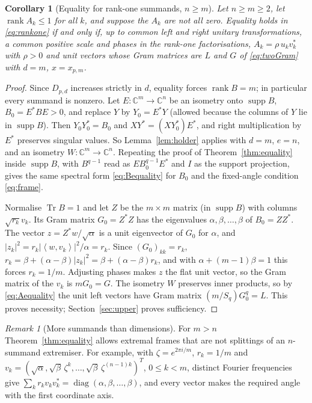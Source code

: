 \documentclass[11pt,a4paper]{article}
\numberwithin{equation}{section}
\newtheorem{corollary}[theorem]{Corollary}
\theoremstyle{definition}
\theoremstyle{remark}
\newtheorem{remark}[theorem]{Remark}
\DeclareMathOperator{\Tr}{Tr}
\DeclareMathOperator{\rank}{rank}
\DeclareMathOperator{\diag}{diag}
\DeclareMathOperator{\supp}{supp}
\newcommand{\C}{\mathbb C}
\newcommand{\abs}[1]{\left\lvert #1\right\rvert}
\newcommand{\ip}[2]{\left\langle #1,#2\right\rangle}
\begin{document}
\begin{corollary}[Equality for rank-one summands, \(n\ge m\)]
\label{cor:rankoneequality}
Let \(n\ge m\ge2\), let \(\rank A_k\le1\) for all \(k\), and suppose the
\(A_k\) are not all zero. Equality holds in \eqref{eq:rankone} if and only
if, up to common left and right unitary transformations, a common positive
scale and phases in the rank-one factorisations,
\(A_k=\rho\,u_kv_k^*\) with \(\rho>0\) and unit vectors whose Gram matrices
are \(L\) and \(G\) of \eqref{eq:twoGram} with \(d=m\), \(x=x_{p,m}\).
\end{corollary}

\begin{proof}
Since \(D_{p,d}\) increases strictly in \(d\), equality forces
\(\rank B=m\); in particular every summand is nonzero. Let
\(E:\C^m\to\C^n\) be an isometry onto \(\supp B\), \(B_0=E^*BE>0\), and
replace \(Y\) by \(Y_0=E^*Y\) (allowed because the columns of \(Y\) lie in
\(\supp B\)). Then \(Y_0Y_0^*=B_0\) and \(XY^*=(XY_0^*)E^*\), and right
multiplication by \(E^*\) preserves singular values. So
Lemma~\ref{lem:holder} applies with \(d=m\), \(e=n\), and an isometry
\(W:\C^m\to\C^n\). Repeating the proof of Theorem~\ref{thm:equality}
inside \(\supp B\), with \(B^{q-1}\) read as \(EB_0^{q-1}E^*\) and \(I\) as
the support projection, gives the same spectral form
\eqref{eq:Bequality} for \(B_0\) and the fixed-angle condition
\eqref{eq:frame}.

Normalise \(\Tr B=1\) and let \(Z\) be the \(m\times m\) matrix (in
\(\supp B\)) with columns \(\sqrt{r_k}v_k\). Its Gram matrix \(G_0=Z^*Z\)
has the eigenvalues \(\alpha,\beta,\ldots,\beta\) of \(B_0=ZZ^*\). The
vector \(z=Z^*w/\sqrt\alpha\) is a unit eigenvector of \(G_0\) for
\(\alpha\), and \(|z_k|^2=r_k\abs{\ip{w}{v_k}}^2/\alpha=r_k\). Since
\((G_0)_{kk}=r_k\),
\(r_k=\beta+(\alpha-\beta)|z_k|^2=\beta+(\alpha-\beta)r_k\), and with
\(\alpha+(m-1)\beta=1\) this forces \(r_k=1/m\). Adjusting phases makes
\(z\) the flat unit vector, so the Gram matrix of the \(v_k\) is
\(mG_0=G\). The isometry \(W\) preserves inner products, so by
\eqref{eq:Aequality} the unit left vectors have Gram matrix
\((m/S_q)G_0^q=L\). This proves necessity; Section~\ref{sec:upper} proves
sufficiency.
\end{proof}

\begin{remark}[More summands than dimensions]\label{rem:harmonic}
For \(m>n\) Theorem~\ref{thm:equality} allows extremal frames that are
not splittings of an \(n\)-summand extremiser. For example, with
\(\zeta=e^{2\pi i/m}\), \(r_k=1/m\) and
\(v_k=(\sqrt\alpha,\sqrt\beta\,\zeta^k,\ldots,\sqrt\beta\,\zeta^{(n-1)k})^T\),
\(0\le k<m\), distinct Fourier frequencies give
\(\sum_kr_kv_kv_k^*=\diag(\alpha,\beta,\ldots,\beta)\), and every vector
makes the required angle with the first coordinate axis.
\end{remark}
\end{document}

